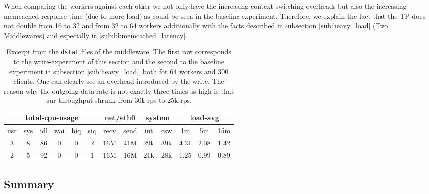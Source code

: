 \documentclass[11pt,a4paper]{article}
\let\tt\texttt
\begin{document}
When comparing the workers against each other we not only have the increasing context switching overheads but also the increasing memcached response time (due to more load) as could be seen in the baseline experiment. Therefore, we explain the fact that the TP does not double from 16 to 32 and from 32 to 64 workers additionally with the facts described in subsection \ref{sub:heavy_load} (Two Middlewares) and especially in \ref{sub:bl:memcached_latency}. 

\begin{table}
    \centering
    \begin{tabular}{|c|c|c|c|c|c|c|c|c|c|c|c|c|} \hline
         \multicolumn{6}{|c|}{total-cpu-usage} & \multicolumn{2}{|c|}{net/eth0} & \multicolumn{2}{|c|}{system} & \multicolumn{3}{|c|}{load-avg} \\ \hline
         usr &sys &idl &wai &hiq &siq &recv  &send &int  & csw  &1m   &5m  &15m \\ \hhline{|=|=|=|=|=|=|=|=|=|=|=|=|=|} 
         3   &8  &86  & 0  & 0 &  2 & 16M &  41M& 29k  & 39k& 4.31&2.08& 1.42 \\ \hline
          2  & 5 & 92  & 0  & 0  & 1 & 16M &  16M &21k  & 28k& 1.25& 0.99& 0.89 \\ \hline
    \end{tabular}
    \caption{Excerpt from the \tt{dstat} files of the middleware. The first row corresponds to the write-experiment of this section and the second to the baseline experiment in subsection \ref{sub:heavy_load}, both for 64 workers and 300 clients. One can clearly see an overhead introduced by the write. The reason why the outgoing data-rate is not exactly three times as high is that our throughput shrunk from 30k rps to 25k rps.}
    \label{tbl:write_overhead}
\end{table}





\subsection{Summary}\label{sub:writes:summary}
\end{document}
